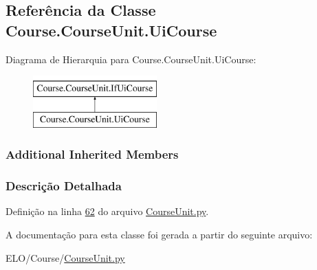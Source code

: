 \hypertarget{classCourse_1_1CourseUnit_1_1UiCourse}{\subsection{Referência da Classe Course.\-Course\-Unit.\-Ui\-Course}
\label{classCourse_1_1CourseUnit_1_1UiCourse}
}
Diagrama de Hierarquia para Course.\-Course\-Unit.\-Ui\-Course\-:\begin{figure}[H]
\begin{center}
\leavevmode
\includegraphics[height=2.000000cm]{d1/dbb/classCourse_1_1CourseUnit_1_1UiCourse}
\end{center}
\end{figure}
\subsubsection*{Additional Inherited Members}


\subsubsection{Descrição Detalhada}


Definição na linha \hyperlink{CourseUnit_8py_source_l00062}{62} do arquivo \hyperlink{CourseUnit_8py_source}{Course\-Unit.\-py}.



A documentação para esta classe foi gerada a partir do seguinte arquivo\-:\begin{DoxyCompactItemize}
\item 
E\-L\-O/\-Course/\hyperlink{CourseUnit_8py}{Course\-Unit.\-py}\end{DoxyCompactItemize}
